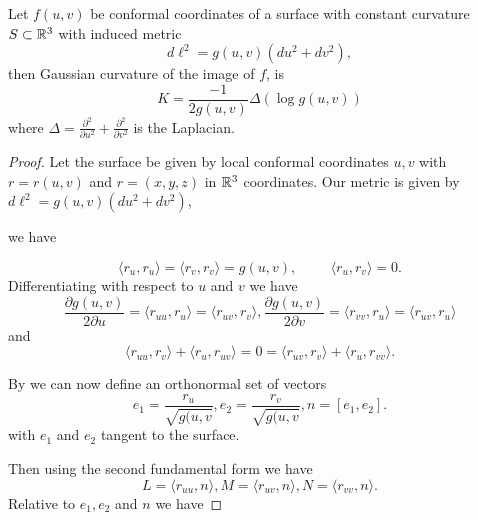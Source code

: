 \begin{theorem}\label{thm:liouville}
	Let $f(u,v)$ be conformal coordinates of a surface with constant curvature $S\subset \mathbb{R}^3$ with
	induced metric 
	$$d\ell^2=g(u,v)(du^2+dv^2),$$
	then Gaussian curvature of the image of $f$,  is 
		\begin{equation}\label{eqn:log-curve}
			K=\frac{-1}{2g(u,v)}\Delta(\log g(u,v))
		\end{equation}
		where $\Delta=\frac{\partial^2}{\partial u^2}+\frac{\partial^2}{\partial v^2}$
		is the Laplacian.
\end{theorem}
\begin{proof}
	Let the surface be given by local conformal coordinates $u,v$
	with $r=r(u,v)$ and $r=(x,y,z)$ in $\mathbb{R}^3$ coordinates.
	Our metric is given by $d\ell^2=g(u,v)(du^2+dv^2)$,
	
	we have 
	
	\begin{equation}\label{eqn:log-curve-proof-inners}
		\langle r_u,r_u\rangle = \langle r_v,r_v\rangle=g(u,v), \hspace{1cm} \langle r_u,r_v\rangle=  0.
	\end{equation}
	Differentiating with respect to $u$ and $v$ we have
	\begin{equation}\label{eqn:log-curve-proof-firsts}
		\frac{ \partial g(u,v)}{2\partial u}=\langle r_{uu}, r_u\rangle =\langle r_{uv}, r_v\rangle,
		\frac{ \partial g(u,v)}{2\partial v}=\langle r_{vv}, r_u\rangle =\langle r_{uv}, r_u\rangle
		\end{equation}
		and
		\begin{equation}\label{eqn:log-curve-proof-firsts-1}
		\langle r_{uu},r_v\rangle + \langle r_u, r_{uv}\rangle=0=\langle r_{uv},r_v\rangle + \langle r_u, r_{vv}\rangle.
		\end{equation}
	
	
	By  we can now define an orthonormal set of vectors
	\begin{equation}\label{eqn:log-curve-proof-orthog}
		e_1=\frac{r_u}{\sqrt{g(u,v}}, e_2=\frac{r_v}{\sqrt{g(u,v}}, n=[e_1,e_2].
	\end{equation}
	with $e_1$ and $e_2$ tangent to the surface.
	
	Then using the second fundamental form we have
	$$L=\langle r_{uu},n\rangle , M=\langle r_{uv},n\rangle, N=\langle r_{vv},n\rangle.$$
	Relative to $e_1, e_2$ and $n$ we have
	

\end{proof}
